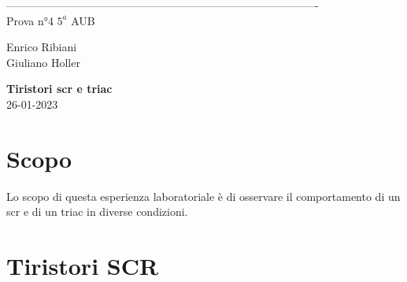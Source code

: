 \documentclass[12pt]{article}
\begin{document}
    \begin{titlepage}
    \begin{center}
\begin{figure}
    \centering
    \label{fig:logo}
\end{figure}
-------------------------------------------------------------------------------------\\
\vspace{2\baselineskip}
\large Prova n°4
\hfill
\large $5^a$   AUB\\
\begin{flushleft}
    \large Enrico Ribiani\\
    \large Giuliano Holler\\
\end{flushleft}


\vfill

\Huge{\textbf{Tiristori scr e triac}}\\
\vfill
\vfill
\large{26-01-2023}
\end{center}
\end{titlepage}
\tableofcontents
\newpage
\vskip 1cm
\section{Scopo}
Lo scopo di questa esperienza laboratoriale è di osservare il comportamento di un scr e di un triac in diverse condizioni.
\noindent
\section{Tiristori SCR}
\end{document}
